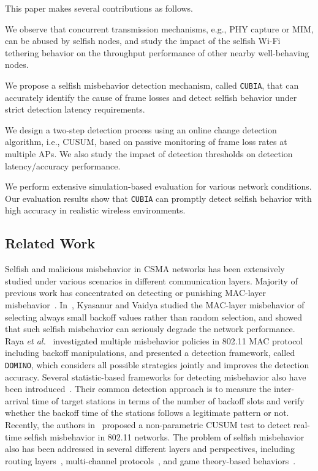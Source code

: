 This paper makes several contributions as follows.
%
\myitemizebegin
%
\item We observe that concurrent transmission mechanisms, e.g.,
PHY capture or MIM, can be abused by selfish nodes, and study
the impact of the selfish Wi-Fi tethering behavior on
the throughput performance of other nearby well-behaving nodes.
%
\item We propose a selfish misbehavior detection mechanism,
called {\tt CUBIA}, that can accurately identify the cause of
frame losses and detect selfish behavior under strict detection
latency requirements.
%
\item We design a two-step detection process using an online
change detection algorithm, i.e., CUSUM, based on passive
monitoring of frame loss rates at multiple APs. We also
study the impact of detection thresholds on detection
latency/accuracy performance.
%
\item We perform extensive simulation-based evaluation for
various network conditions. Our evaluation results show that
{\tt CUBIA} can promptly detect selfish behavior with high
accuracy in realistic wireless environments.
%
\myitemizeend

\subsection{Related Work}

Selfish and malicious misbehavior in CSMA networks has been
extensively studied under various scenarios in different 
communication layers.
%
Majority of previous work has concentrated on detecting or punishing
MAC-layer misbehavior~\cite{K:Vaidya05, Raya-DOMINO, Radosavac-Wise05,
Toledo:Wang07a}.
%
In~\cite{K:Vaidya05}, Kyasanur and Vaidya studied the MAC-layer
misbehavior of selecting always small backoff values rather than
random selection, and showed that such selfish misbehavior can
seriously degrade the network performance.
%
Raya {\em et al.}~\cite{Raya-DOMINO} investigated multiple misbehavior
policies in 802.11 MAC protocol including backoff manipulations, and
presented a detection framework, called {\tt DOMINO}, which considers
all possible strategies jointly and improves the detection accuracy.
%
Several statistic-based frameworks for detecting misbehavior
also have been introduced~\cite{Radosavac-Wise05, Toledo:Wang07a}.
%
Their common detection approach is to measure the inter-arrival time
of target stations in terms of the number of backoff slots and verify
whether the backoff time of the stations follows a legitimate pattern
or not.
%
Recently, the authors in~\cite{Tang:Zhuang13} proposed a
non-parametric CUSUM test to detect real-time selfish misbehavior 
in 802.11 networks.
%
The problem of selfish misbehavior also has been addressed in several
different layers and perspectives, including routing
layers~\cite{BenSalem03, Marti03}, multi-channel
protocols~\cite{Zhang:Lazos13}, and game theory-based
behaviors~\cite{MacKenzie01,Akella02}.

